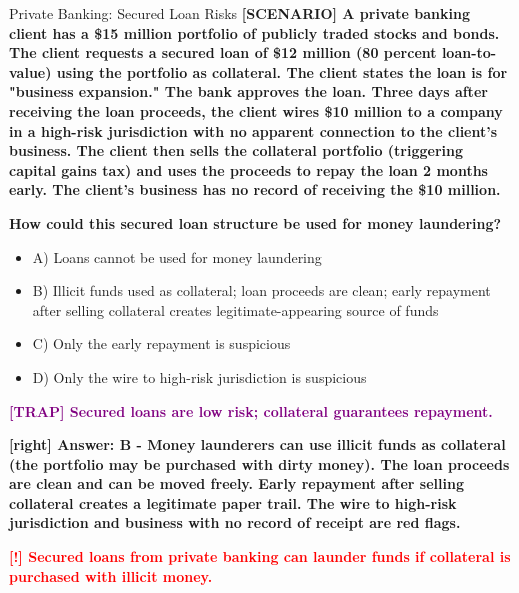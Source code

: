 \documentclass[11pt,a4paper]{beamer}
\newcommand{\redflag}[1]{\textcolor{red}{\textbf{[!] #1}}}
\newcommand{\trap}[1]{\textcolor{purple}{\textbf{[TRAP] #1}}}
\newcommand{\correct}[1]{\textcolor{green!50!black}{\textbf{[right] #1}}}
\newcommand{\scenario}[1]{\textcolor{blue!70!black}{\textbf{[SCENARIO] #1}}}
\begin{document}
	
	\begin{frame}{Private Banking: Secured Loan Risks}
		\tiny
		\scenario{A private banking client has a \$15 million portfolio of publicly traded stocks and bonds. The client requests a secured loan of \$12 million (80 percent loan-to-value) using the portfolio as collateral. The client states the loan is for "business expansion." The bank approves the loan. Three days after receiving the loan proceeds, the client wires \$10 million to a company in a high-risk jurisdiction with no apparent connection to the client's business. The client then sells the collateral portfolio (triggering capital gains tax) and uses the proceeds to repay the loan 2 months early. The client's business has no record of receiving the \$10 million.}
		
		\vspace{0.02cm}
		\textbf{How could this secured loan structure be used for money laundering?}
		\vspace{0.02cm}
		
		\begin{itemize}
			\item A) Loans cannot be used for money laundering
			\item B) Illicit funds used as collateral; loan proceeds are clean; early repayment after selling collateral creates legitimate-appearing source of funds
			\item C) Only the early repayment is suspicious
			\item D) Only the wire to high-risk jurisdiction is suspicious
		\end{itemize}
		
		\vspace{0.02cm}
		\trap{Secured loans are low risk; collateral guarantees repayment.}
		
		\vspace{0.02cm}
		\correct{Answer: B - Money launderers can use illicit funds as collateral (the portfolio may be purchased with dirty money). The loan proceeds are clean and can be moved freely. Early repayment after selling collateral creates a legitimate paper trail. The wire to high-risk jurisdiction and business with no record of receipt are red flags.}
		
		\vspace{0.02cm}
		\redflag{Secured loans from private banking can launder funds if collateral is purchased with illicit money.}
	\end{frame}
	
\end{document}
